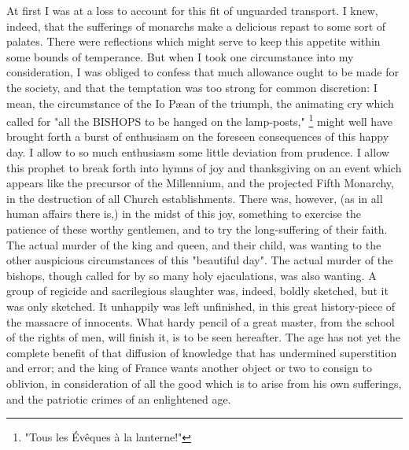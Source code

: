 At first I was at a loss to account for this fit of unguarded transport. I knew, indeed, that the sufferings of monarchs make a delicious repast to some sort of palates. There were reflections which might serve to keep this appetite within some bounds of temperance. But when I took one circumstance into my consideration, I was obliged to confess that much allowance ought to be made for the society, and that the temptation was too strong for common discretion: I mean, the circumstance of the Io Pæan of the triumph, the animating cry which called for "all the BISHOPS to be hanged on the lamp-posts,"
\footnote{ "Tous les Évêques à la lanterne!"}
 might well have brought forth a burst of enthusiasm on the foreseen consequences of this happy day. I allow to so much enthusiasm some little deviation from prudence. I allow this prophet to break forth into hymns of joy and thanksgiving on an event which appears like the precursor of the Millennium, and the projected Fifth Monarchy, in the destruction of all Church establishments. There was, however, (as in all human affairs there is,) in the midst of this joy, something to exercise the patience of these worthy gentlemen, and to try the long-suffering of their faith. The actual murder of the king and queen, and their child, was wanting to the other auspicious circumstances of this "beautiful day". The actual murder of the bishops, though called for by so many holy ejaculations, was also wanting. A group of regicide and sacrilegious slaughter was, indeed, boldly sketched, but it was only sketched. It unhappily was left unfinished, in this great history-piece of the massacre of innocents. What hardy pencil of a great master, from the school of the rights of men, will finish it, is to be seen hereafter. The age has not yet the complete benefit of that diffusion of knowledge that has undermined superstition and error; and the king of France wants another object or two to consign to oblivion, in consideration of all the good which is to arise from his own sufferings, and the patriotic crimes of an enlightened age.
